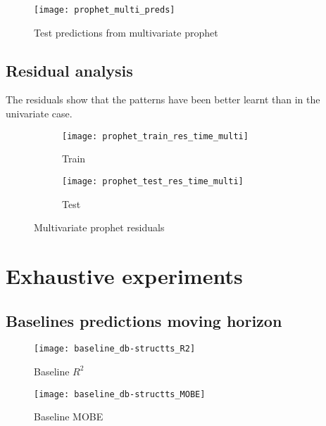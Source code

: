 \begin{figure}[H]
	\centering
	\texttt{[image: prophet\_multi\_preds]}
	\caption{Test predictions from multivariate prophet}
	\label{fig:prophet_multi_preds}
\end{figure}


\subsection{Residual analysis}

The residuals show that the patterns have been better learnt than in the univariate case.

\begin{figure}[hptb]
	\centering
	\begin{subfigure}{.8\textwidth}
		\texttt{[image: prophet\_train\_res\_time\_multi]}
		\caption{Train}
		\label{fig:prophet_train_res_time_multi}
	\end{subfigure}%
	\hfill
	\begin{subfigure}{.8\textwidth}
		\texttt{[image: prophet\_test\_res\_time\_multi]}
		\caption{Test}
		\label{fig:prophet_test_res_time_multi}
	\end{subfigure}
	\caption{Multivariate prophet residuals}
	\label{fig:prophet_res_time_multi}
\end{figure}



\section{Exhaustive experiments}

\subsection{Baselines predictions moving horizon}

\begin{figure}[H]
	\centering
	\texttt{[image: baseline\_db-structts\_R2]}
	\caption{Baseline $R^2$}
	\label{fig:baseline_structts_r2}
\end{figure}

\begin{figure}[H]
	\centering
	\texttt{[image: baseline\_db-structts\_MOBE]}
	\caption{Baseline MOBE}
	\label{fig:baseline_structts_mobe}
\end{figure}




